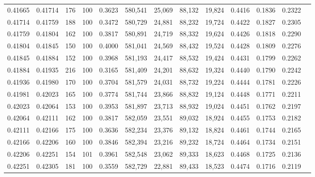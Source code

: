 \begin{tabular}{rrrrrrrrrrrrr}
0.41665 & 0.41714 &   176 & 100 &                                     0.3623 & 580,541 &  25,069 &  88,132 &  19,824 & 0.4416 & 0.1836 & 0.2322 \\
0.41714 & 0.41759 &   188 & 100 &                                     0.3472 & 580,729 &  24,881 &  88,232 &  19,724 & 0.4422 & 0.1827 & 0.2305 \\
0.41759 & 0.41804 &   162 & 100 &                                     0.3817 & 580,891 &  24,719 &  88,332 &  19,624 & 0.4426 & 0.1818 & 0.2290 \\
0.41804 & 0.41845 &   150 & 100 &                                     0.4000 & 581,041 &  24,569 &  88,432 &  19,524 & 0.4428 & 0.1809 & 0.2276 \\
0.41845 & 0.41884 &   152 & 100 &                                     0.3968 & 581,193 &  24,417 &  88,532 &  19,424 & 0.4431 & 0.1799 & 0.2262 \\
0.41884 & 0.41935 &   216 & 100 &                                     0.3165 & 581,409 &  24,201 &  88,632 &  19,324 & 0.4440 & 0.1790 & 0.2242 \\
0.41936 & 0.41980 &   170 & 100 &                                     0.3704 & 581,579 &  24,031 &  88,732 &  19,224 & 0.4444 & 0.1781 & 0.2226 \\
0.41981 & 0.42023 &   165 & 100 &                                     0.3774 & 581,744 &  23,866 &  88,832 &  19,124 & 0.4448 & 0.1771 & 0.2211 \\
0.42023 & 0.42064 &   153 & 100 &                                     0.3953 & 581,897 &  23,713 &  88,932 &  19,024 & 0.4451 & 0.1762 & 0.2197 \\
0.42064 & 0.42111 &   162 & 100 &                                     0.3817 & 582,059 &  23,551 &  89,032 &  18,924 & 0.4455 & 0.1753 & 0.2182 \\
0.42111 & 0.42166 &   175 & 100 &                                     0.3636 & 582,234 &  23,376 &  89,132 &  18,824 & 0.4461 & 0.1744 & 0.2165 \\
0.42166 & 0.42206 &   160 & 100 &                                     0.3846 & 582,394 &  23,216 &  89,232 &  18,724 & 0.4464 & 0.1734 & 0.2151 \\
0.42206 & 0.42251 &   154 & 101 &                                     0.3961 & 582,548 &  23,062 &  89,333 &  18,623 & 0.4468 & 0.1725 & 0.2136 \\
0.42251 & 0.42305 &   181 & 100 &                                     0.3559 & 582,729 &  22,881 &  89,433 &  18,523 & 0.4474 & 0.1716 & 0.2119 \\

\end{tabular}
